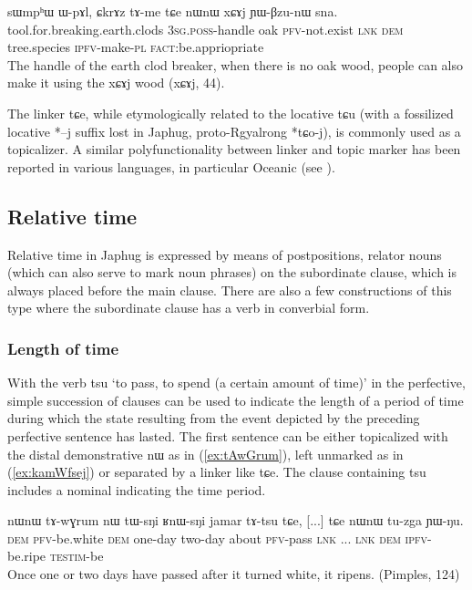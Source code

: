 \documentclass[oldfontcommands,oneside,a4paper,11pt]{article}
\newcommand{\ipa}[1]{{\phon \mbox{#1}}} %
\newcommand{\refb}[1]{(\ref{#1})}
\begin{document}
\begin{exe}
\ex \label{ex:chWphWtnW.chWBdenW}
\gll 
   	\ipa{sɯmpʰɯ}  	\ipa{ɯ-pɤl,}  	\ipa{ɕkrɤz}  	\ipa{tɤ-me}  	\ipa{tɕe}  	\ipa{nɯnɯ}  	\ipa{xɕɤj}  	\ipa{ɲɯ-βzu-nɯ}  	\ipa{sna.}  \\
   	tool.for.breaking.earth.clods \textsc{3sg.poss}-handle oak \textsc{pfv}-not.exist \textsc{lnk} \textsc{dem} tree.species \textsc{ipfv}-make-\textsc{pl} \textsc{fact}:be.appriopriate \\
\glt The handle of the earth clod breaker, when there is no oak wood, people can also make it using the xɕɤj wood (xɕɤj, 44).
\end{exe}
 
 The linker \ipa{tɕe}, while etymologically related to the locative \ipa{tɕu} (with a fossilized locative *\ipa{--j} suffix lost in Japhug, proto-Rgyalrong *\ipa{tɕo-j}), is commonly used as a topicalizer. A similar polyfunctionality between linker and topic marker has been reported in various languages, in particular Oceanic   (see  \citealt{bril10oceanic}).
  
\subsection{Relative time} \label{sec:relative.time}
Relative time in Japhug is expressed by means of postpositions, relator nouns (which can also serve to mark noun phrases) on the subordinate clause, which is always placed before the main clause. There are also a few constructions of this type where the subordinate clause has a verb in converbial form. 





 \subsubsection{Length of time}
With the verb \ipa{tsu} `to pass, to spend (a certain amount of time)' in the perfective, simple succession of clauses can be used to indicate the length of a period of time during which the state resulting from the event depicted by the preceding perfective sentence has lasted.  The first sentence can be either topicalized with the distal demonstrative \ipa{nɯ} as in \refb{ex:tAwGrum}, left unmarked as in \refb{ex:kamWfsej} or separated by a linker like \ipa{tɕe}. The clause containing \ipa{tsu} includes a nominal indicating the time period.

\begin{exe}
\ex \label{ex:tAwGrum}
\gll 
\ipa{nɯnɯ}   	\ipa{tɤ-wɣrum}   	\ipa{nɯ}   	\ipa{tɯ-sŋi}   	\ipa{ʁnɯ-sŋi}   	\ipa{jamar}   	\ipa{tɤ-tsu}   	\ipa{tɕe,}   	[...] 	\ipa{tɕe}   	\ipa{nɯnɯ}   	\ipa{tu-zga}   	\ipa{ɲɯ-ŋu.}   \\
\textsc{dem} \textsc{pfv}-be.white \textsc{dem} one-day two-day about \textsc{pfv}-pass \textsc{lnk} ... \textsc{lnk} \textsc{dem} \textsc{ipfv}-be.ripe \textsc{testim}-be \\
\glt  Once one or two days have passed after it turned white, it   ripens. (Pimples, 124)
\end{exe}
\end{document}
